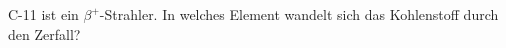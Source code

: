 \documentclass[12pt,a4paper,twoside]{article}
\begin{document}
%
%
%
%
%
% 
%
%
%
% 
%
%
\begin{aufgabe}
	C-11 ist ein $\beta^{+}$-Strahler. In welches Element wandelt sich das Kohlenstoff durch den Zerfall?
\end{aufgabe}
\end{document}
